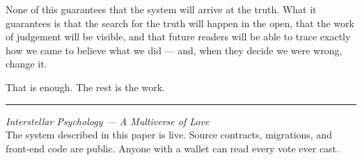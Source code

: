 \documentclass[11pt,a4paper]{article}
\begin{document}
None of this guarantees that the system will arrive at the truth.
What it guarantees is that the search for the truth will happen in
the open, that the work of judgement will be visible, and that
future readers will be able to trace exactly how we came to believe
what we did --- and, when they decide we were wrong, change it.

That is enough. The rest is the work.

\vspace{2em}
\hrule
\vspace{1em}

\begin{center}
\textit{Interstellar Psychology --- A Multiverse of Love}\\
\small
The system described in this paper is live. Source contracts,
migrations, and front-end code are public. Anyone with a wallet
can read every vote ever cast.
\end{center}
\end{document}
